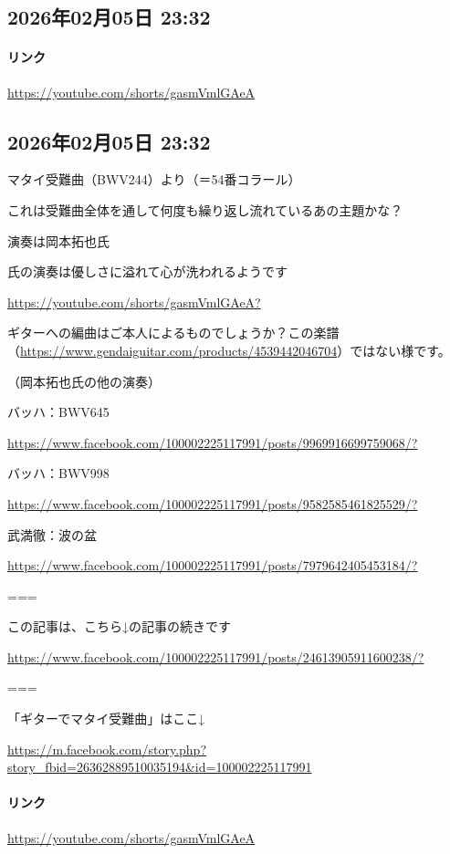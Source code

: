 \subsection*{2026年02月05日 23:32}

\paragraph{リンク}
\url{https://youtube.com/shorts/gasmVmlGAeA}

\subsection*{2026年02月05日 23:32}

マタイ受難曲（BWV244）より（＝54番コラール）

これは受難曲全体を通して何度も繰り返し流れているあの主題かな？

演奏は岡本拓也氏

氏の演奏は優しさに溢れて心が洗われるようです

\url{https://youtube.com/shorts/gasmVmlGAeA?}

ギターへの編曲はご本人によるものでしょうか？この楽譜（\url{https://www.gendaiguitar.com/products/4539442046704}）ではない様です。

（岡本拓也氏の他の演奏）

バッハ：BWV645

\url{https://www.facebook.com/100002225117991/posts/9969916699759068/?}

バッハ：BWV998

\url{https://www.facebook.com/100002225117991/posts/9582585461825529/?}

武満徹：波の盆

\url{https://www.facebook.com/100002225117991/posts/7979642405453184/?}

===

この記事は、こちら↓の記事の続きです

\url{https://www.facebook.com/100002225117991/posts/24613905911600238/?}

===

「ギターでマタイ受難曲」はここ↓

\url{https://m.facebook.com/story.php?story_fbid=26362889510035194&id=100002225117991}

\paragraph{リンク}
\url{https://youtube.com/shorts/gasmVmlGAeA}

